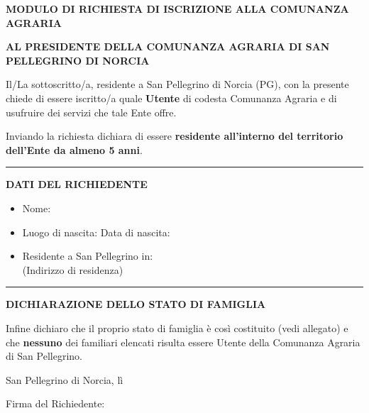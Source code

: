 \documentclass[a4paper,12pt]{article}
\newcommand{\linea}[1]{\makebox[#1]{\hrulefill}}
\newcommand{\lineacorta}{\linea{3cm}} %
\newcommand{\lineamedia}{\linea{5cm}} %
\newcommand{\linealunga}{\linea{10cm}}
\begin{document}
\begin{center}
    \textbf{\Large MODULO DI RICHIESTA DI ISCRIZIONE ALLA COMUNANZA AGRARIA}
\end{center}

\vspace{0.5cm}

\textbf{AL PRESIDENTE DELLA COMUNANZA AGRARIA DI SAN PELLEGRINO DI NORCIA}

\vspace{0.5cm}

Il/La sottoscritto/a, residente a San Pellegrino di Norcia (PG), con la presente chiede di essere iscritto/a quale \textbf{Utente} di codesta Comunanza Agraria e di usufruire dei servizi che tale Ente offre.

\vspace{0.3cm}

Inviando la richiesta dichiara di essere \textbf{residente all'interno del territorio dell'Ente da almeno 5 anni}.

\vspace{0.5cm}

\hrule
\vspace{0.5cm}

\textbf{\large DATI DEL RICHIEDENTE}

\vspace{0.3cm}

\begin{itemize}
    \item Nome: \linealunga
    \item Luogo di nascita: \lineamedia \quad Data di nascita: \lineacorta
    \item Residente a San Pellegrino in: \linealunga \\
    \small{(Indirizzo di residenza)}
\end{itemize}

\vspace{0.5cm}

\hrule
\vspace{0.5cm}

\textbf{\large DICHIARAZIONE DELLO STATO DI FAMIGLIA}

\vspace{0.3cm}

Infine dichiaro che il proprio stato di famiglia è così costituito (vedi allegato) e che \textbf{nessuno} dei familiari elencati risulta essere Utente della Comunanza Agraria di San Pellegrino.

\vspace{0.3cm}


\vspace{1cm}


\vspace{0.5cm}


San Pellegrino di Norcia, lì \lineacorta \quad\quad\quad \\

\vspace{1cm}

Firma del Richiedente: \lineamedia
\end{document}
